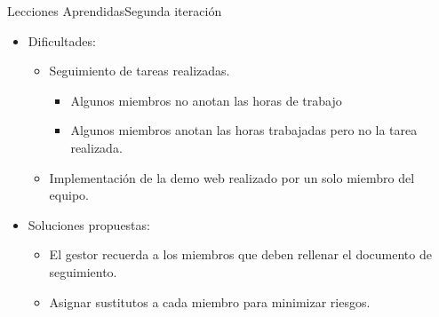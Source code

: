 \documentclass{beamer}
\begin{document}
	\begin{frame}{Lecciones Aprendidas}{Segunda iteraci\'on}
		\begin{itemize}
			\item {
				Dificultades:
				\begin{itemize}
					\item {
						Seguimiento de tareas realizadas.
						\begin{itemize}
							\item {
								Algunos miembros no anotan las horas de trabajo
							}
							\item {
								Algunos miembros anotan las horas trabajadas pero no la tarea realizada.
							}
						\end{itemize}
					}
					\item {
						Implementaci\'on de la demo web realizado por un solo miembro del equipo.
					}
				\end{itemize}
			}
			\item {
				\vspace{0.5cm}
				Soluciones propuestas:
				\begin{itemize}
					\item {
						El gestor recuerda a los miembros que deben rellenar el documento de seguimiento.
					}
					\item {
						Asignar sustitutos a cada miembro para minimizar riesgos.
					}
				\end{itemize}
			}
		\end{itemize}
	
	  
	\end{frame}
	
\end{document}

